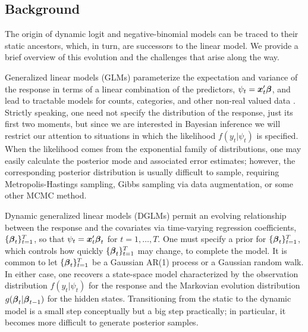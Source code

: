 \subsection{Background}

\npoint The origin of dynamic logit and negative-binomial models can be traced
to their static ancestors, which, in turn, are successors to the linear model.
We provide a brief overview of this evolution and the challenges that arise
along the way.

\npoint Generalized linear models (GLMs) 
parameterize the expectation and variance of the response in terms of a linear
combination of the predictors, $\psi_t = \boldsymbol{x}_t' \boldsymbol{\beta}$, and lead to tractable
models for counts, categories, and other non-real valued data
\citep{wedderburn-1974, mccullagh-nelder-1989}.  Strictly speaking, one need not
specify the distribution of the response, just its first two moments, but since
we are interested in Bayesian inference we will restrict our attention to
situations in which the likelihood $f(y_t | \psi_t)$ is specified.  When the
likelihood comes from the exponential family of distributions, one may easily
calculate the posterior mode and associated error estimates; however, the
corresponding posterior distribution is usually difficult to sample, requiring
Metropolis-Hastings sampling, Gibbs sampling via data augmentation, or some
other MCMC method.

\npoint Dynamic generalized linear models (DGLMs) permit an evolving
relationship between the response and the covariates via time-varying regression
coefficients, $\{\boldsymbol{\beta}_t\}_{t=1}^T$, so that $\psi_t = \boldsymbol{x}_t' \boldsymbol{\beta}_t$ for
$t=1, \ldots, T$.  One must specify a prior for $\{\boldsymbol{\beta}_t\}_{t=1}^T$, which
controls how quickly $\{\boldsymbol{\beta}_t\}_{t=1}^T$ may change, to complete the model.
It is common to let $\{\boldsymbol{\beta}_t\}_{t=1}^T$ be a Gaussian AR(1) process or a
Gaussian random walk.  In either case, one recovers a state-space model
characterized by the observation distribution $f(y_t | \psi_t)$ for the response
and the Markovian evolution distribution $g(\boldsymbol{\beta}_t | \boldsymbol{\beta}_{t-1})$ for the
hidden states.  Transitioning from the static to the dynamic model is a small
step conceptually but a big step practically; in particular, it becomes more
difficult to generate posterior samples.

